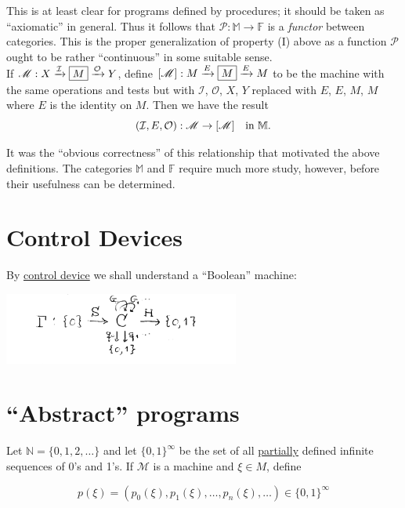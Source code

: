 \documentclass{article}
\newcommand{\scM}{\mathscr{M}}
\newcommand{\scP}{\mathscr{P}}
\newcommand{\mcI}{\mathcal{I}}
\newcommand{\mcO}{\mathcal{O}}
\newcommand{\ff}{\mathbb{F}}
\newcommand{\mm}{\mathbb{M}}
\newcommand{\nn}{\mathbb{N}}
\begin{document}
This is at least clear for programs defined by procedures; it should be taken as ``axiomatic'' in general. Thus it follows that $\scP: \mm \to \ff$ is a \textit{functor} between categories. This is the proper generalization of property (I) above as a function $\scP$ ought to be rather ``continuous'' in some suitable sense. \\ 

If $\scM : X \xrightarrow{\mcI} \fbox{$M$} \xrightarrow{\mcO} Y$, define $[\scM] : M \xrightarrow{E} \fbox{$M$} \xrightarrow{E} M$ to be the machine with the same operations and tests but with $\mcI$, $\mcO$, $X$, $Y$ replaced with $E$, $E$, $M$, $M$ where $E$ is the identity on $M$. Then we have the result
\begin{equation*}
    (\mcI, E, \mcO) : \scM \to [\scM] \textrm{\quad in } \mm.
\end{equation*}

It was the ``obvious correctness'' of this relationship that motivated the above definitions. The categories $\mm$ and $\ff$ require much more study, however, before their usefulness can be determined. 

\section{Control Devices}

By \underline{control device} we shall understand a ``Boolean'' machine: 

\begin{center}
    \includegraphics[width=220pt]{dg6.png}
\end{center}

\section{``Abstract'' programs}

Let $\nn = \{0, 1, 2, \ldots\}$ and let $\{0, 1\}^\infty$ be the set of all \underline{partially} defined infinite sequences of 0's and 1's. If $\scM$ is a machine and $\xi \in M$, define 

\begin{equation*}
  p(\xi) = (p_0(\xi), p_1(\xi), \ldots, p_n(\xi), \ldots) \in \{0,1\}^\infty  
\end{equation*}
\end{document}
